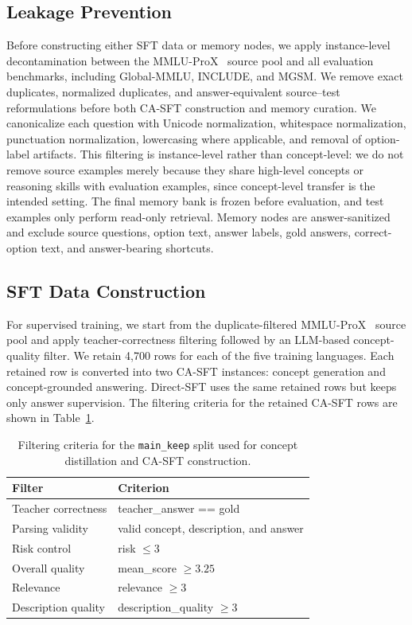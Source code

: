 \documentclass[11pt]{article}
\begin{document}
\subsection{Leakage Prevention}
Before constructing either SFT data or memory nodes, we apply instance-level decontamination between the MMLU-ProX~\citep{xuan2025mmlu} source pool and all evaluation benchmarks, including Global-MMLU, INCLUDE, and MGSM. We remove exact duplicates, normalized duplicates, and answer-equivalent source--test reformulations before both CA-SFT construction and memory curation. We canonicalize each question with Unicode normalization, whitespace normalization, punctuation normalization, lowercasing where applicable, and removal of option-label artifacts. This filtering is instance-level rather than concept-level: we do not remove source examples merely because they share high-level concepts or reasoning skills with evaluation examples, since concept-level transfer is the intended setting. The final memory bank is frozen before evaluation, and test examples only perform read-only retrieval. Memory nodes are answer-sanitized and exclude source questions, option text, answer labels, gold answers, correct-option text, and answer-bearing shortcuts.

\subsection{SFT Data Construction}
For supervised training, we start from the duplicate-filtered MMLU-ProX~\citep{xuan2025mmlu} source pool and apply teacher-correctness filtering followed by an LLM-based concept-quality filter. We retain 4,700 rows for each of the five training languages. Each retained row is converted into two CA-SFT instances: concept generation and concept-grounded answering. Direct-SFT uses the same retained rows but keeps only answer supervision. The filtering criteria for the retained CA-SFT rows are shown in Table~\ref{tab:main_keep_filter}.

\begin{table}[!htbp]
\centering
\scriptsize
\setlength{\tabcolsep}{4pt}
\begin{tabular}{l l}
\hline
Filter & Criterion \\
\hline
Teacher correctness & teacher\_answer == gold \\
Parsing validity & valid concept, description, and answer \\
Risk control & risk $\leq 3$ \\
Overall quality & mean\_score $\geq 3.25$ \\
Relevance & relevance $\geq 3$ \\
Description quality & description\_quality $\geq 3$ \\
\hline
\end{tabular}
\caption{Filtering criteria for the \texttt{main\_keep} split used for concept distillation and CA-SFT construction.}
\label{tab:main_keep_filter}
\end{table}
\end{document}
